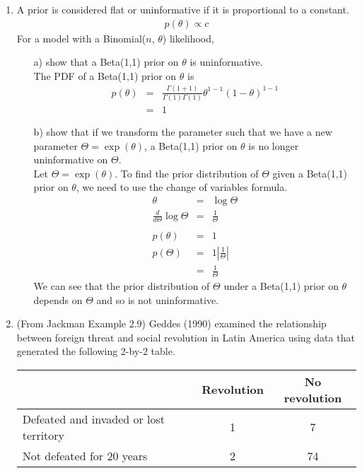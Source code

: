 \documentclass[10pt,a4paper]{article}
\newcommand{\red}{\color{red}}
\newcommand{\black}{\color{black}}
\begin{document}
\begin{enumerate}
\bigskip

\item A prior is considered flat or uninformative if it is proportional to a constant.
\begin{eqnarray*}
p(\theta) \propto c
\end{eqnarray*}
For a model with a Binomial($n$, $\theta$) likelihood,
\begin{itemize}
\item[a)] show that a Beta(1,1) prior on $\theta$ is uninformative. \\

\medskip \red
The PDF of a Beta(1,1) prior on $\theta$ is
\begin{eqnarray*}
p(\theta) &=& \frac{\Gamma(1+1)}{\Gamma(1) \Gamma(1)} \theta^{1-1} (1-\theta)^{1-1} \\
&=& 1
\end{eqnarray*}
\medskip \black

\item[b)] show that if we transform the parameter such that we have a new parameter $\Theta = \exp(\theta)$, a Beta(1,1) prior on $\theta$ is no longer uninformative on $\Theta$. \\ 

\medskip \red
Let $\Theta = \exp(\theta)$.  To find the prior distribution of $\Theta$ given a Beta(1,1) prior on $\theta$, we need to use the change of variables formula.
\begin{eqnarray*}
\theta &=& \log \Theta \\
\frac{d}{d\Theta} \log \Theta &=& \frac{1}{\Theta} \\\\
p(\theta) &=& 1\\
p(\Theta) &=& 1 \left \vert \frac{1}{\Theta} \right \vert \\
&=& \frac{1}{\Theta} 
\end{eqnarray*}
We can see that the prior distribution of $\Theta$ under a Beta(1,1) prior on $\theta$ depends on $\Theta$ and so is not uninformative. 
\black \medskip

\end{itemize}

\bigskip

\item (From Jackman Example 2.9) Geddes (1990) examined the relationship between foreign threat and social revolution in Latin America using data that generated the following 2-by-2 table.

\medskip
\begin{center}
\begin{tabular}{lcc}
\hline 
& Revolution & No revolution \\
\hline
Defeated and invaded or lost territory & 1 & 7 \\
Not defeated for 20 years & 2 & 74 \\
\hline
\end{tabular}
\end{center}
\medskip


\end{enumerate}
\end{document}
